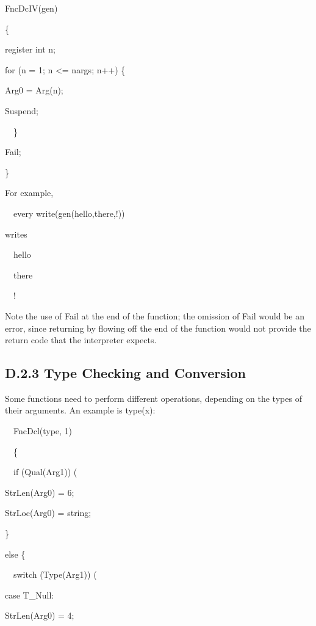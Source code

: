 {\ttfamily\mdseries
FncDcIV(gen)}

{\ttfamily\mdseries
\{}

{\ttfamily\mdseries
register int n;}

{\ttfamily\mdseries
for (n = 1; n {\textless}= nargs; n++) \{}

{\ttfamily\mdseries
Arg0 = Arg(n);}

{\ttfamily\mdseries
Suspend;}

{\ttfamily\mdseries
\ \ \}}

{\ttfamily\mdseries
Fail;}

{\ttfamily\mdseries
\}}


For example,

{\ttfamily\mdseries
\ \ every
write(gen({\textquotedbl}hello{\textquotedbl},{\textquotedbl}there{\textquotedbl},{\textquotedbl}!{\textquotedbl}))}


writes

{\ttfamily\mdseries
\ \ hello}

{\ttfamily\mdseries
\ \ there}

{\ttfamily\mdseries
\ \ !}


Note the use of Fail at the end of the function; the omission of Fail
would be an error, since returning by flowing off the end of the
function would not provide the return code that the interpreter
expects.

\subsection{D.2.3 Type Checking and Conversion}

Some functions need to perform different operations, depending on the
types of their arguments. An example is type(x):

{\ttfamily\mdseries
\ \ FncDcl(type, 1)}

{\ttfamily\mdseries
\ \ \{}

{\ttfamily\mdseries
\ \ if (Qual(Arg1)) (}

{\ttfamily\mdseries
StrLen(Arg0) = 6;}

{\ttfamily\mdseries
StrLoc(Arg0) = {\textquotedbl}string{\textquotedbl};}

{\ttfamily\mdseries
\}}

{\ttfamily\mdseries
else \{}

{\ttfamily\mdseries
\ \ switch (Type(Arg1)) (}

{\ttfamily\mdseries
case T\_Null:}

{\ttfamily\mdseries
StrLen(Arg0) = 4;}

